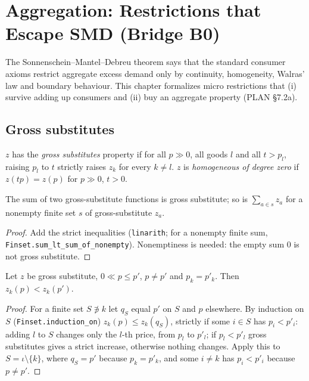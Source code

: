 \chapter{Aggregation: Restrictions that Escape SMD (Bridge B0)}
\label{chap:aggregation}

The Sonnenschein--Mantel--Debreu theorem says that the standard consumer axioms restrict aggregate excess demand
only by continuity, homogeneity, Walras' law and boundary behaviour. This chapter formalizes micro restrictions that
(i) survive adding up consumers and (ii) buy an aggregate property (PLAN \S7.2a).

\section{Gross substitutes}
\label{sec:gross_substitutes}

\begin{definition}
\label{def:gross_substitutes}
\leanok
$z$ has the \emph{gross substitutes} property if for all $p \gg 0$, all goods $l$ and all $t > p_l$, raising $p_l$ to
$t$ strictly raises $z_k$ for every $k \neq l$. $z$ is \emph{homogeneous of degree zero} if $z(tp) = z(p)$ for
$p \gg 0$, $t > 0$.
\end{definition}

\begin{theorem}
\label{thm:gs_sum}
\leanok
{}
The sum of two gross-substitute functions is gross substitute; so is $\sum_{a \in s} z_a$ for a nonempty finite set
$s$ of gross-substitute $z_a$.
\end{theorem}
\begin{proof}
\leanok
Add the strict inequalities (\texttt{linarith}; for a nonempty finite sum, \texttt{Finset.sum\_lt\_sum\_of\_nonempty}).
Nonemptiness is needed: the empty sum $0$ is not gross substitute.
\end{proof}

\begin{lemma}
\label{lem:gs_path}
\leanok
{}
Let $z$ be gross substitute, $0 \ll p \le p'$, $p \ne p'$ and $p_k = p'_k$. Then $z_k(p) < z_k(p')$.
\end{lemma}
\begin{proof}
\leanok
For a finite set $S \not\ni k$ let $q_S$ equal $p'$ on $S$ and $p$ elsewhere. By induction on $S$
(\texttt{Finset.induction\_on}) $z_k(p) \le z_k(q_S)$, strictly if some $i \in S$ has $p_i < p'_i$: adding $l$ to $S$
changes only the $l$-th price, from $p_l$ to $p'_l$; if $p_l < p'_l$ gross substitutes gives a strict increase,
otherwise nothing changes. Apply this to $S = \iota \setminus \{k\}$, where $q_S = p'$ because $p_k = p'_k$, and some
$i \ne k$ has $p_i < p'_i$ because $p \neq p'$.
\end{proof}

